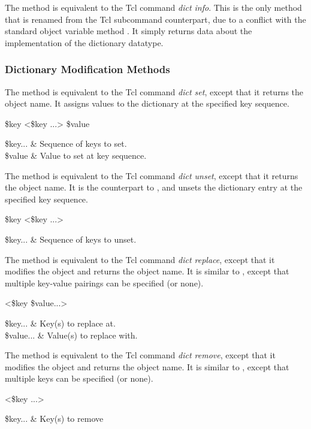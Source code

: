 \documentclass{article}
\begin{document}
The method  is equivalent to the Tcl command \textit{dict info}. This is the only method that is renamed from the Tcl subcommand counterpart, due to a conflict with the standard object variable method .
It simply returns data about the implementation of the dictionary datatype.
\begin{syntax}
\end{syntax}
\clearpage
\subsubsection{Dictionary Modification Methods}

The method  is equivalent to the Tcl command \textit{dict set}, except that it returns the object name.
It assigns values to the dictionary at the specified key sequence.
\begin{syntax}
 \$key <\$key ...> \$value
\end{syntax}
\begin{args}
\$key... & Sequence of keys to set. \\
\$value & Value to set at key sequence.
\end{args}

The method  is equivalent to the Tcl command \textit{dict unset}, except that it returns the object name.
It is the counterpart to , and unsets the dictionary entry at the specified key sequence.
\begin{syntax}
 \$key <\$key ...>
\end{syntax}
\begin{args}
\$key... & Sequence of keys to unset. 
\end{args}

The method  is equivalent to the Tcl command \textit{dict replace}, except that it modifies the object and returns the object name.
It is similar to , except that multiple key-value pairings can be specified (or none).
\begin{syntax}
 <\$key \$value...>
\end{syntax}
\begin{args}
\$key... & Key(s) to replace at. \\
\$value... & Value(s) to replace with. 
\end{args}

The method  is equivalent to the Tcl command \textit{dict remove}, except that it modifies the object and returns the object name.
It is similar to , except that multiple keys can be specified (or none).
\begin{syntax}
 <\$key ...>
\end{syntax}
\begin{args}
\$key... & Key(s) to remove
\end{args}
\end{document}
